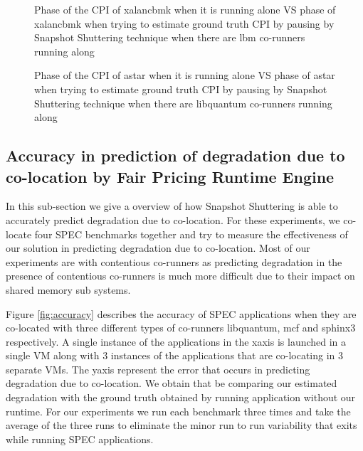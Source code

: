 \documentclass[pageno]{jpaper}
\begin{document}
\begin{figure*}
\centering
\begin{minipage}[t]{1\columnwidth}
\centering
{}
\caption{Phase of the CPI of xalancbmk when it is running alone VS phase of xalancbmk when trying to estimate ground truth CPI by pausing by Snapshot Shuttering technique when there are lbm co-runners running along}
\label{fig:astarlbml1d}
\end{minipage}
\hfill\begin{minipage}[t]{1\columnwidth}
\centering
{}
\caption{Phase of the CPI of astar when it is running alone VS phase of astar when trying to estimate ground truth CPI by pausing by Snapshot Shuttering technique when there are libquantum co-runners running along}
\label{fig:astarlib2}
\end{minipage}
\end{figure*}
\subsection{Accuracy in prediction of degradation due to co-location by Fair Pricing Runtime Engine}
\label{subsec:Accuracyinpredictionofdegradationduetoco-locationbyFairPricingRuntimeEngine}

In this sub-section we give a overview of how Snapshot Shuttering is able to accurately predict degradation due to co-location. For these experiments, we co-locate four SPEC benchmarks together and try to measure the effectiveness of our solution in predicting degradation due to co-location. Most of our experiments are with contentious co-runners as predicting degradation in the presence of contentious co-runners is much more difficult due to their impact on shared memory sub systems.

Figure \ref{fig:accuracy} describes the accuracy of SPEC applications when they are co-located with three different types of co-runners libquantum, mcf and sphinx3 respectively. A single instance of the applications in the xaxis is launched in a single VM along with 3 instances of the applications that are co-locating in 3 separate VMs. The yaxis represent the error that occurs in predicting degradation due to co-location. We obtain that be comparing our estimated degradation with the ground truth obtained by running application without our runtime. For our experiments we run each benchmark three times and take the average of the three runs to eliminate the minor run to run variability that exits while running SPEC applications.
\end{document}
